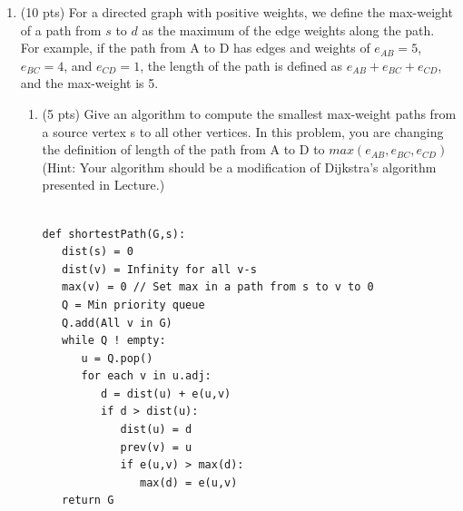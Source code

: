 \documentclass[12pt]{article}
\theoremstyle{remark}
\begin{document}
\hrulefill

\newpage
\begin{enumerate}

\item (10 pts) For a directed graph with positive weights, we define the max-weight of a path from $s$ to $d$ as the maximum of the edge weights along the path. For example, if the path from A to D has edges and weights of $e_{AB} = 5$, $e_{BC} = 4$, and $e_{CD}=1$, the length of the path is defined as $e_{AB} + e_{BC} + e_{CD}$, and the max-weight is 5.
\begin{enumerate}
\item(5 pts) Give an algorithm to compute the smallest max-weight paths from a source vertex s to all other vertices. In this problem, you are changing the definition of length of the path from A to D to $max(e_{AB}, e_{BC}, e_{CD})$ (Hint: Your algorithm should be a modification of Dijkstra's algorithm presented in Lecture.)\\ \\

\begin{verbatim}
def shortestPath(G,s): 
   dist(s) = 0 
   dist(v) = Infinity for all v-s
   max(v) = 0 // Set max in a path from s to v to 0
   Q = Min priority queue
   Q.add(All v in G)
   while Q ! empty:
      u = Q.pop()
      for each v in u.adj:
         d = dist(u) + e(u,v)
         if d > dist(u):
            dist(u) = d
            prev(v) = u
            if e(u,v) > max(d):
               max(d) = e(u,v)
   return G
\end{verbatim}


\end{enumerate}
\end{enumerate}
\end{document}
